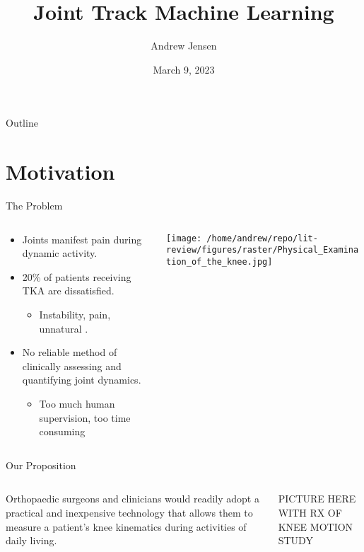\documentclass[presentation]{beamer}
\author{Andrew Jensen}
\date{March 9, 2023}
\title{Joint Track Machine Learning}
\begin{document}
\maketitle
\begin{frame}{Outline}
\tableofcontents
\end{frame}


\section{Motivation}
\label{sec:org073845d}
\begin{frame}[label={sec:org080654d}]{The Problem}
\begin{columns}
\begin{column}{0.5\columnwidth}
\begin{itemize}
\item Joints manifest pain during dynamic activity.
\item 20\% of patients receiving TKA are dissatisfied.
\begin{itemize}
\item Instability, pain, unnatural \autocites{bakerRolePainFunction2007}[][]{bournePatientSatisfactionTotal2010}[][]{scottPredictingDissatisfactionFollowing2010}.
\end{itemize}
\item No reliable method of clinically assessing and quantifying joint dynamics.
\begin{itemize}
\item Too much human supervision, too time consuming
\end{itemize}
\end{itemize}
\end{column}
\begin{column}{0.5\columnwidth}
\begin{center}
\texttt{[image: /home/andrew/repo/lit-review/figures/raster/Physical\_Examination\_of\_the\_knee.jpg]}
\end{center}
\end{column}
\end{columns}
\end{frame}
\begin{frame}[label={sec:orgfd8ee84}]{Our Proposition}
\begin{columns}
\begin{column}{0.5\columnwidth}
Orthopaedic surgeons and clinicians would readily adopt a practical and inexpensive technology that allows them to measure a patient's knee kinematics during activities of daily living.
\end{column}
\begin{column}{0.55\columnwidth}
PICTURE HERE WITH RX OF KNEE MOTION STUDY
\end{column}
\end{columns}
\end{frame}
\end{document}
